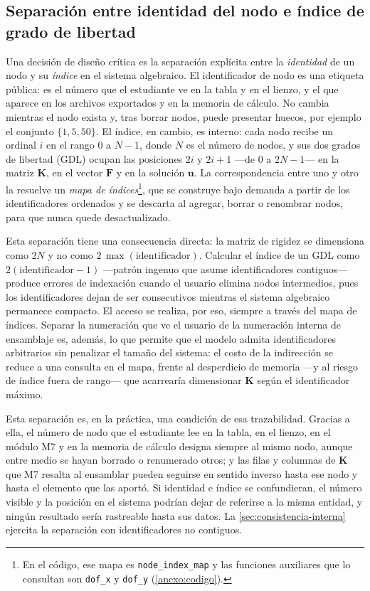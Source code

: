 \subsection{Separación entre identidad del nodo e índice de grado de libertad}
\label{sec:identidad-gdl}

Una decisión de diseño crítica es la separación explícita entre la \emph{identidad} de un nodo y su \emph{índice} en el sistema algebraico. El identificador de nodo es una etiqueta pública: es el número que el estudiante ve en la tabla y en el lienzo, y el que aparece en los archivos exportados y en la memoria de cálculo. No cambia mientras el nodo exista y, tras borrar nodos, puede presentar huecos, por ejemplo el conjunto $\{1, 5, 50\}$. El índice, en cambio, es interno: cada nodo recibe un ordinal $i$ en el rango $0$ a $N-1$, donde $N$ es el número de nodos, y sus dos grados de libertad (GDL) ocupan las posiciones $2i$ y $2i+1$ —de $0$ a $2N-1$— en la matriz $\bm{K}$, en el vector $\bm{F}$ y en la solución $\bm{u}$. La correspondencia entre uno y otro la resuelve un \emph{mapa de índices}\footnote{En el código, ese mapa es \texttt{node\_index\_map} y las funciones auxiliares que lo consultan son \texttt{dof\_x} y \texttt{dof\_y} (\autoref{anexo:codigo}).}, que se construye bajo demanda a partir de los identificadores ordenados y se descarta al agregar, borrar o renombrar nodos, para que nunca quede desactualizado.

Esta separación tiene una consecuencia directa: la matriz de rigidez se dimensiona como $2N$ y no como $2\,\max(\text{identificador})$. Calcular el índice de un GDL como $2(\text{identificador}-1)$ —patrón ingenuo que asume identificadores contiguos— produce errores de indexación cuando el usuario elimina nodos intermedios, pues los identificadores dejan de ser consecutivos mientras el sistema algebraico permanece compacto. El acceso se realiza, por eso, siempre a través del mapa de índices. Separar la numeración que ve el usuario de la numeración interna de ensamblaje es, además, lo que permite que el modelo admita identificadores arbitrarios sin penalizar el tamaño del sistema: el costo de la indirección se reduce a una consulta en el mapa, frente al desperdicio de memoria —y al riesgo de índice fuera de rango— que acarrearía dimensionar $\bm{K}$ según el identificador máximo.

Esta separación es, en la práctica, una condición de esa trazabilidad. Gracias a ella, el número de nodo que el estudiante lee en la tabla, en el lienzo, en el módulo M7 y en la memoria de cálculo designa siempre al mismo nodo, aunque entre medio se hayan borrado o renumerado otros; y las filas y columnas de $\bm{K}$ que M7 resalta al ensamblar pueden seguirse en sentido inverso hasta ese nodo y hasta el elemento que las aportó. Si identidad e índice se confundieran, el número visible y la posición en el sistema podrían dejar de referirse a la misma entidad, y ningún resultado sería rastreable hasta sus datos. La \autoref{sec:consistencia-interna} ejercita la separación con identificadores no contiguos.

